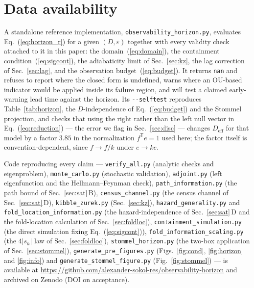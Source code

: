 \documentclass[%
 twocolumn,
 superscriptaddress,
 amsmath,amssymb,
 aps,
 pre,
 floatfix,
]{revtex4-2}
\begin{document}
\section*{Data availability}
A standalone reference implementation, \texttt{observability\_\allowbreak horizon.py}, evaluates
Eq.~(\ref{eq:horizon_r}) for a given $(D,\varepsilon)$ together with every validity check
attached to it in this paper: the domain~(\ref{eq:domain}), the containment
condition~(\ref{eq:sigcont}), the adiabaticity limit of Sec.~\ref{sec:kz}, the
lag correction of Sec.~\ref{sec:lag}, and the observation budget~(\ref{eq:budget}).  It
returns \texttt{nan} and refuses to report where the closed form is undefined, warns where
an OU-based indicator would be applied inside its failure region, and will test a claimed
early-warning lead time against the horizon.  Its \texttt{-\/-selftest} reproduces
Table~\ref{tab:horizon}, the $D$-independence of Eq.~(\ref{eq:budget}) and the Stommel
projection, and checks that using the right rather than the left null vector in
Eq.~(\ref{eq:reduction}) --- the error we flag in Sec.~\ref{sec:disc} --- changes
$D_{\mathrm{eff}}$ for that model by a factor $3.85$ in the normalization
$f^{\mathsf T}e=1$ used here; the factor itself is convention-dependent,
since $f\to f/k$ under $e\to ke$.

Code reproducing every claim --- \texttt{verify\_\allowbreak all.py} (analytic checks and eigenproblem),
\texttt{monte\_\allowbreak carlo.py} (stochastic validation), \texttt{adjoint.py} (left eigenfunction and
the Hellmann--Feynman check), \texttt{path\_\allowbreak information.py} (the path bound of
Sec.~\ref{sec:sat}\,B), \texttt{census\_\allowbreak channel.py} (the census channel of Sec.~\ref{sec:sat}\,D),
\texttt{kibble\_\allowbreak zurek.py} (Sec.~\ref{sec:kz}), \texttt{hazard\_\allowbreak generality.py} and
\texttt{fold\_\allowbreak location\_\allowbreak information.py} (the hazard-independence of Sec.~\ref{sec:sat}\,D and the
fold-location calculation of Sec.~\ref{sec:foldloc}), \texttt{containment\_\allowbreak simulation.py} (the direct simulation fixing Eq.~(\ref{eq:sigcont})),
\texttt{fold\_\allowbreak information\_\allowbreak scaling.py} (the $4|s_h|$ law of Sec.~\ref{sec:foldloc}),
\texttt{stommel\_\allowbreak horizon.py} (the two-box
application of Sec.~\ref{sec:stommel}), \texttt{generate\_\allowbreak pre\_\allowbreak figures.py}
(Figs.~\ref{fig:cond}, \ref{fig:horizon} and \ref{fig:info}) and
\texttt{generate\_\allowbreak stommel\_\allowbreak figure.py} (Fig.~\ref{fig:stommel}) --- is
available at \url{https://github.com/alexander-sokol-res/observability-horizon} and archived
on Zenodo (DOI on acceptance).

\appendix



\end{document}

